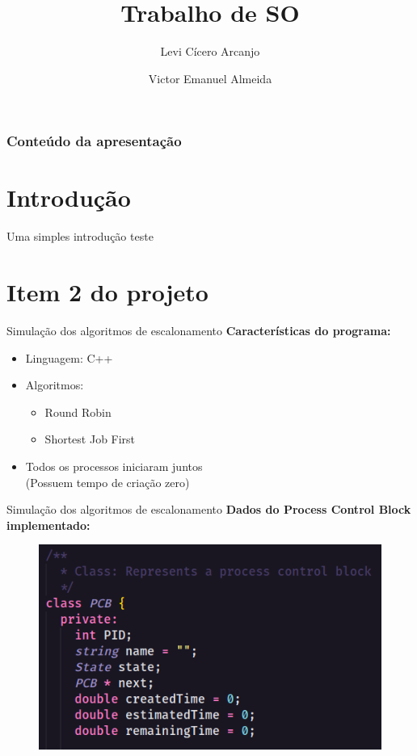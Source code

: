 \documentclass{beamer}
\author[Levi, Victor]{Levi Cícero Arcanjo  \and Victor Emanuel Almeida}
\title{Trabalho de SO}
\begin{document}
	\frame{\titlepage}
	\begin{frame}
		\frametitle{Conteúdo da apresentação}
		\tableofcontents
	\end{frame}
	\section{Introdução}
	\begin{frame}{Uma simples introdução}
		teste
	\end{frame}
	
	\section{Item 2 do projeto}
	
	
\begin{frame}{Simulação dos algoritmos de escalonamento}
    \textbf{Características do programa:}
	\begin{itemize}
	    \item Linguagem: C++
		\item Algoritmos: 
		    \begin{itemize}
		        \item Round Robin
		        \item Shortest Job First
		    \end{itemize}
		 \item Todos os processos iniciaram juntos \\ (Possuem tempo de criação zero)
	\end{itemize}
\end{frame}

\begin{frame}{Simulação dos algoritmos de escalonamento}
    \textbf{Dados do Process Control Block implementado:}
	\begin{figure}[!htb]
		\centering
		\includegraphics[keepaspectratio, scale=.6]{PCB.png}
	\end{figure}
\end{frame}
\end{document}
